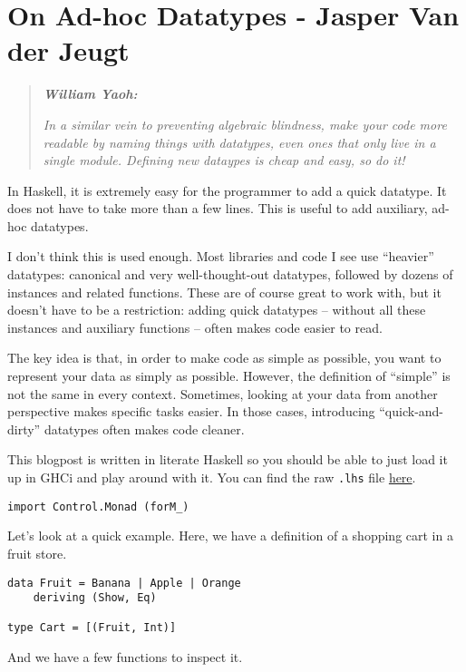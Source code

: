 \chapter{On Ad-hoc Datatypes - Jasper Van der Jeugt}

\begin{quotation}
\noindent\textit{\textbf{William Yaoh:}}

\textit{In a similar vein to preventing algebraic blindness, make your code more readable by naming things with datatypes, even ones that only live in a single module. Defining new dataypes is cheap and easy, so do it!}
\end{quotation}
In Haskell, it is extremely easy for the programmer to add a quick datatype. It does not have to take more than a few lines. This is useful to add auxiliary, ad-hoc datatypes.

I don't think this is used enough. Most libraries and code I see use ``heavier'' datatypes: canonical and very well-thought-out datatypes, followed by dozens of instances and related functions. These are of course great to work with, but it doesn't have to be a restriction: adding quick datatypes -- without all these instances and auxiliary functions -- often makes code easier to read.

The key idea is that, in order to make code as simple as possible, you want to represent your data as simply as possible. However, the definition of ``simple'' is not the same in every context. Sometimes, looking at your data from another perspective makes specific tasks easier. In those cases, introducing ``quick-and-dirty'' datatypes often makes code cleaner.

This blogpost is written in literate Haskell so you should be able to just load it up in GHCi and play around with it. You can find the raw \texttt{.lhs} file \href{https://github.com/jaspervdj/jaspervdj/raw/master/posts/2016-05-11-ad-hoc-datatypes.lhs}{here}.

\begin{verbatim}
import Control.Monad (forM_)
\end{verbatim}
Let's look at a quick example. Here, we have a definition of a shopping cart in a fruit store.

\begin{verbatim}
data Fruit = Banana | Apple | Orange
    deriving (Show, Eq)

type Cart = [(Fruit, Int)]
\end{verbatim}
And we have a few functions to inspect it.

